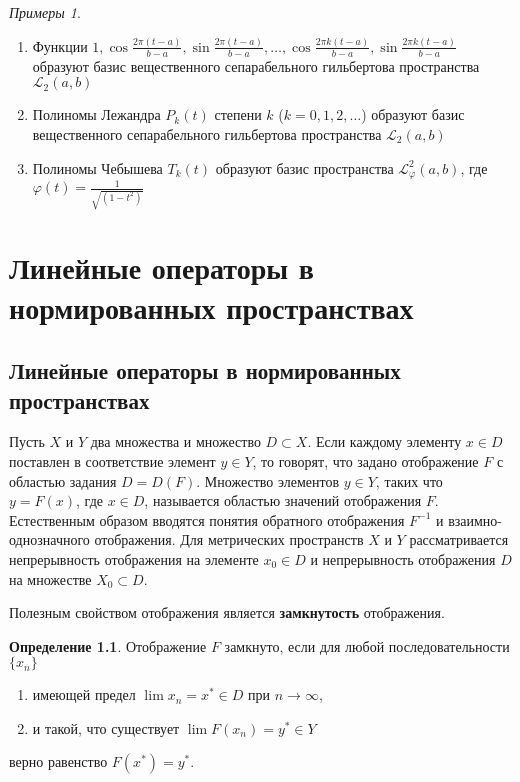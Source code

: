 \documentclass[12pt,a4paper,titlepage,oneside]{book}
\theoremstyle{definition}
\newtheorem*{definition}{Определение}
\theoremstyle{plain}
\theoremstyle{remark}
\theoremstyle{remark}
\theoremstyle{remark}
\newtheorem*{examples}{Примеры}
\theoremstyle{remark}
\theoremstyle{plain}
\theoremstyle{plain}
\begin{document}
\begin{examples}
\leavevmode
\begin{enumerate}
	\item Функции $1, \cos \frac{2 \pi (t - a)}{b - a}, \sin \frac{2 \pi (t - a)}{b - a}, \ldots, \cos \frac{2 \pi k (t - a)}{b - a}, \sin \frac{2 \pi k (t - a)}{b - a}$ образуют базис вещественного сепарабельного гильбертова пространства $\mathcal{L}_2(a, b)$
	
	\item Полиномы Лежандра $P_k(t)$ степени $k$ ($k = 0, 1, 2, \ldots$) образуют базис вещественного сепарабельного гильбертова пространства $\mathcal{L}_2(a, b)$
	
	\item Полиномы Чебышева $T_k(t)$ образуют базис пространства $\mathcal{L}_{\varphi}^2 (a, b)$, где $\varphi(t) = \frac{1}{\sqrt{(1 - t^2)}}$
\end{enumerate}
\end{examples}

\chapter{Линейные операторы в нормированных пространствах}

\section{Линейные операторы в нормированных пространствах}
Пусть $X$ и $Y$ два множества и множество $D \subset X$. Если каждому элементу $x \in D$ поставлен в соответствие элемент $y \in Y$, то говорят, что задано отображение $F$ с областью задания $D=D(F)$. Множество элементов $y \in Y$, таких что $y=F(x)$, где $x \in D$, называется областью значений отображения $F$. Естественным образом вводятся понятия обратного отображения ${F}^{-1}$ и взаимно-однозначного отображения. Для метрических пространств $X$ и $Y$ рассматривается непрерывность отображения на элементе $x_0 \in D$ и непрерывность отображения $D$ на множестве $X_0 \subset D$.

Полезным свойством отображения является \textbf{замкнутость} отображения.

\begin{definition} Отображение $F$ замкнуто, если для любой последовательности  $\lbrace x_n \rbrace$

\begin{enumerate}

 \item имеющей предел $\lim x_n= x^* \in D$ при $n\to\infty$,
 
 \item и такой, что существует $\lim F(x_n)= y^* \in Y$
 
\end{enumerate} 
 
верно равенство $F(x^*)=y^*$.

\end{definition}
\end{document}
